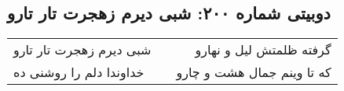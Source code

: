 \begin{center}
\section*{دوبیتی شماره ۲۰۰: شبی دیرم زهجرت تار تارو}
\label{sec:200}
\begin{longtable}{l p{0.5cm} r}
شبی دیرم زهجرت تار تارو
&&
گرفته ظلمتش لیل و نهارو
\\
خداوندا دلم را روشنی ده
&&
که تا وینم جمال هشت و چارو
\\
\end{longtable}
\end{center}
